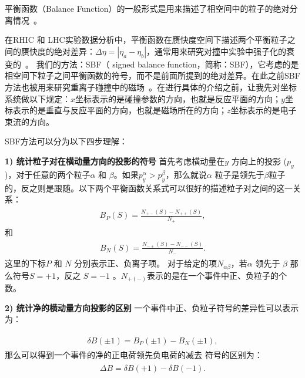 平衡函数（Balance Function）的一般形式是用来描述了相空间中的粒子的绝对分离情况~\cite{Bass:2000az,Adams:2003kg}。

在RHIC 和 LHC实验数据分析中，平衡函数在赝快度空间下描述两个平衡粒子之间的赝快度的绝对差异：$\Delta \eta = |\eta_a - \eta_b|$，通常用来研究对撞中实验中强子化的衰变的~\cite{bf1,bf2,bf3,bf4,bf5}。
我们的方法：SBF（ signed balance function，简称：SBF），它考虑的是相空间下粒子之间平衡函数的符号，而不是前面所提到的绝对差异。在此之前SBF方法也被用来研究重离子碰撞中的磁场~\cite{Ye:2018jwq}。在进行具体的介绍之前，让我先对坐标系统做以下规定：$x$坐标表示的是碰撞参数的方向，也就是反应平面的方向；$y$坐标表示的是垂直与反应平面的方向，也就是磁场所在的方向；$z$坐标表示的是电子束流的方向。

SBF方法可以分为以下四步理解：


\textbf{1) 统计粒子对在横动量方向的投影的符号 } 首先考虑横动量在$y$ 方向上的投影 ($p_y$)，对于任意的两个粒子$\alpha$ 和 $\beta$。如果$p^\alpha_y >  p^\beta_y$，那么就说$\alpha$ 粒子是领先于$\beta$粒子的，反之则是跟随。以下两个平衡函数关系式可以很好的描述粒子对之间的这一关系：
\begin{eqnarray}
\begin{aligned}
B_{P} (S) =  \frac{N_{+-}(S)-N_{++}(S)}{N_+},
\end{aligned}
\label{eq:Bp}
\end{eqnarray}
和
\begin{eqnarray}
\begin{aligned}
B_{N} (S) =  \frac{N_{-+}(S)-N_{--}(S)}{N_-}.
\end{aligned}
\label{eq:Bn}
\end{eqnarray}
这里的下标$P$ 和 $N$ 分别表示正、负离子项。
对于给定的项$N_{\alpha\beta}$，若$\alpha$ 领先于 $\beta$ 那么符号$S=+1$，反之 $S=-1$ 。$N_{+(-)}$表示的是在一个事件中正、负粒子的个数。

\textbf{2) 统计净的横动量方向投影的区别 } 一个事件中正、负粒子符号的差异性可以表示为：

\begin{eqnarray}
\begin{aligned}
\delta B(\pm 1) =  B_{P}(\pm 1)-B_{N}(\pm 1),
\end{aligned}
\label{eq:deltaB_pm}
\end{eqnarray}
那么可以得到一个事件的净的正电荷领先负电荷的减去
符号的区别为：
\begin{eqnarray}
\begin{aligned}
\Delta B =  \delta B(+1) - \delta B(-1).
\end{aligned}
\label{eq:deltaB}
\end{eqnarray}

